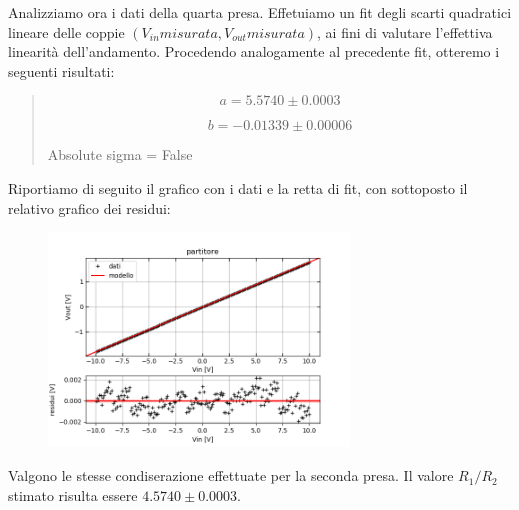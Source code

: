 Analizziamo ora i dati della quarta presa. Effetuiamo un fit degli scarti quadratici lineare delle coppie $(V_{in} misurata, V_{out} misurata)$, ai fini di valutare l'effettiva linearità dell'andamento. Procedendo analogamente al precedente fit, otteremo i seguenti risultati:
\begin{center}
\begin{verse}
\begin{equation}
    a = 5.5740 \pm 0.0003
\end{equation}\par
\begin{equation}
    b = -0.01339 \pm 0.00006
\end{equation}\par
\begin{center}
Absolute sigma = False\par
\end{center}
\end{verse}
\end{center}

Riportiamo di seguito il grafico con i dati e la retta di fit, con sottoposto il relativo grafico dei residui:
\begin{figure}[H]
\caption{}
    \includegraphics[width=8cm]{settimana_1/immagini/fit_2.png}
    \centering
\end{figure}

Valgono le stesse condiserazione effettuate per la seconda presa. Il valore $R_{1}/R_{2}$ stimato risulta essere $4.5740 \pm 0.0003$.



